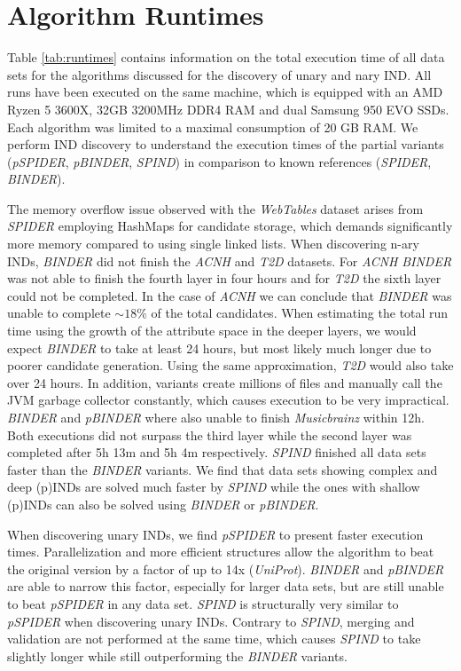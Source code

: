 

\section{Algorithm Runtimes} \label{subsec:runtime}
Table \ref{tab:runtimes} contains information on the total execution time of all data sets for the algorithms discussed for the discovery of unary and nary IND. All runs have been executed on the same machine, which is equipped with an AMD Ryzen 5 3600X, 32GB 3200MHz DDR4 RAM and dual Samsung 950 EVO SSDs. Each algorithm was limited to a maximal consumption of 20 GB RAM. We perform IND discovery to understand the execution times of the partial variants (\textit{pSPIDER}, \textit{pBINDER}, \textit{SPIND}) in comparison to known references (\textit{SPIDER}, \textit{BINDER}).

The memory overflow issue observed with the \textit{WebTables} dataset arises from \textit{SPIDER} employing HashMaps for candidate storage, which demands significantly more memory compared to using single linked lists. When discovering n-ary INDs, \textit{BINDER} did not finish the \textit{ACNH} and \textit{T2D} datasets. For \textit{ACNH} \textit{BINDER} was not able to finish the fourth layer in four hours and for \textit{T2D} the sixth layer could not be completed. In the case of \textit{ACNH} we can conclude that \textit{BINDER} was unable to complete $\sim18\%$ of the total candidates. When estimating the total run time using the growth of the attribute space in the deeper layers, we would expect \textit{BINDER} to take at least 24 hours, but most likely much longer due to poorer candidate generation. Using the same approximation, \textit{T2D} would also take over 24 hours. In addition, variants create millions of files and manually call the JVM garbage collector constantly, which causes execution to be very impractical. \textit{BINDER} and \textit{pBINDER} where also unable to finish \textit{Musicbrainz} within 12h. Both executions did not surpass the third layer while the second layer was completed after 5h 13m and 5h 4m respectively. \textit{SPIND} finished all data sets faster than the \textit{BINDER} variants. We find that data sets showing complex and deep (p)INDs are solved much faster by \textit{SPIND} while the ones with shallow (p)INDs can also be solved using \textit{BINDER} or \textit{pBINDER}.

When discovering unary INDs, we find \textit{pSPIDER} to present faster execution times. Parallelization and more efficient structures allow the algorithm to beat the original version by a factor of up to 14x (\textit{UniProt}). \textit{BINDER} and \textit{pBINDER} are able to narrow this factor, especially for larger data sets, but are still unable to beat \textit{pSPIDER} in any data set. \textit{SPIND} is structurally very similar to \textit{pSPIDER} when discovering unary INDs. Contrary to \textit{SPIND}, merging and validation are not performed at the same time, which causes \textit{SPIND} to take slightly longer while still outperforming the \textit{BINDER} variants.


